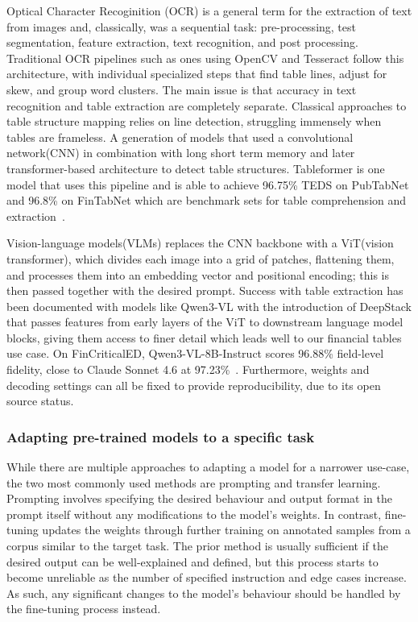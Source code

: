 \documentclass[ %
                    author={Natchalin Iwsakul \\[0.4em] Inkaphol Siriwongwattana \\[0.4em] Tanaphan Kummaraphat \\[0.6em] Patorn Srisupap},,
                supervisor={Fernando Moreno-Pino},
                    degree={MSc},
                     title={Propensity Modelling for SME Commercial Lending Using Open Public Data
},
                  subtitle={Companies House and GDELT as predictors of first-time borrowing},
                      type={},
                      year={2026}]{dissertation}
\begin{document}
Optical Character Recoginition (OCR) is a general term for the extraction of text from images and, classically, was a sequential task: pre-processing, test segmentation, feature extraction, text recognition, and post processing. Traditional OCR pipelines such as ones using OpenCV and Tesseract\cite{tesseract_ocr}\cite{open_cv_and_tesseract} follow this architecture, with individual specialized steps that find table lines, adjust for skew, and group word clusters. The main issue is that accuracy in text recognition and table extraction are completely separate. Classical approaches to table structure mapping relies on line detection, struggling immensely when tables are frameless\cite{open_cv_and_tesseract}. A generation of models that used a convolutional network(CNN) in combination with long short term memory and later transformer-based architecture to detect table structures. Tableformer is one model that uses this pipeline and is able to achieve 96.75\% TEDS on PubTabNet and 96.8\% on FinTabNet which are benchmark sets for table comprehension and extraction~\cite{}.

Vision-language models(VLMs) replaces the CNN backbone with a ViT(vision transformer)\cite{dosovitskiy2021vit}, which divides each image into a grid of patches, flattening them, and processes them into an embedding vector and positional encoding; this is then passed together with the desired prompt. Success with table extraction has been documented with models like Qwen3-VL with the introduction of DeepStack that passes features from early layers of the ViT to downstream language model blocks, giving them access to finer detail which leads well to our financial tables use case. On FinCriticalED, Qwen3-VL-8B-Instruct scores 96.88\% field-level fidelity, close to Claude Sonnet 4.6 at 97.23\%~\cite{he2025fincriticaled}. Furthermore, weights and decoding settings can all be fixed to provide reproducibility, due to its open source status.

\subsubsection{Adapting pre-trained models to a specific task}
While there are multiple approaches to adapting a model for a narrower use-case, the two most commonly used methods are prompting and transfer learning. Prompting involves specifying the desired behaviour and output format in the prompt itself without any modifications to the model's weights. In contrast, fine-tuning updates the weights through further training on annotated samples from a corpus similar to the target task. The prior method is usually sufficient if the desired output can be well-explained and defined, but this process starts to become unreliable as the number of specified instruction and edge cases increase. As such, any significant changes to the model's behaviour should be handled by the fine-tuning process instead.
\end{document}
